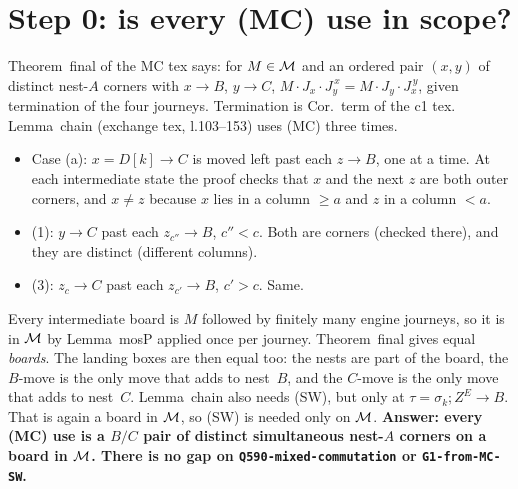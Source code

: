 \documentclass[11pt]{article}
\theoremstyle{definition}\newtheorem{definition}[theorem]{Definition}\newtheorem{remark}[theorem]{Remark}
\newcommand{\toB}{\!\to\! B}\newcommand{\toC}{\!\to\! C}\newcommand{\fa}{\mathfrak a}
\begin{document}
\section{Step 0: is every (MC) use in scope?}\label{sec:step0}
Theorem~final of the MC tex says: for $M\in\mathcal M$ and an ordered pair $(x,y)$ of distinct nest-$A$ corners with $x\toB$, $y\toC$,
$M\cdot J_x\cdot J_y^{\,x}=M\cdot J_y\cdot J_x^{\,y}$, given termination of the four journeys. Termination is Cor.~term of the c1 tex.
Lemma~chain (exchange tex, l.103--153) uses (MC) three times.
\begin{itemize}
\item Case (a): $x=D[k]\toC$ is moved left past each $z\toB$, one at a time. At each intermediate state the proof checks that $x$
and the next $z$ are both outer corners, and $x\ne z$ because $x$ lies in a column $\ge a$ and $z$ in a column $<a$.
\item (1): $y\toC$ past each $z_{c''}\toB$, $c''<c$. Both are corners (checked there), and they are distinct (different columns).
\item (3): $z_c\toC$ past each $z_{c'}\toB$, $c'>c$. Same.
\end{itemize}
Every intermediate board is $M$ followed by finitely many engine journeys, so it is in $\mathcal M$ by Lemma~mosP applied once per journey.
Theorem~final gives equal \emph{boards}. The landing boxes are then equal too: the nests are part of the board, the $B$-move is the only
move that adds to nest~$B$, and the $C$-move is the only move that adds to nest~$C$. Lemma~chain also needs (SW), but only at
$\tau=\sigma_k;Z^E\toB$. That is again a board in $\mathcal M$, so (SW) is needed only on $\mathcal M$. \textbf{Answer: every (MC) use is a
$B/C$ pair of distinct simultaneous nest-$A$ corners on a board in $\mathcal M$. There is no gap on \texttt{Q590-mixed-commutation} or
\texttt{G1-from-MC-SW}.}
\end{document}
